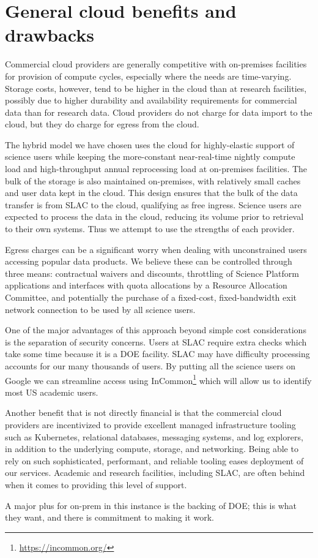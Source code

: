 \section{General cloud benefits and drawbacks} \label{sec:tradeoffs}

Commercial cloud providers are generally competitive with on-premises facilities for provision of compute cycles, especially where the needs are time-varying.
Storage costs, however, tend to be higher in the cloud than at research facilities, possibly due to higher durability and availability requirements for commercial data than for research data.
Cloud providers do not charge for data import to the cloud, but they do charge for egress from the cloud.

The hybrid model we have chosen uses the cloud for highly-elastic support of science users while keeping the more-constant near-real-time nightly compute load and high-throughput annual reprocessing load at on-premises facilities.
The bulk of the storage is also maintained on-premises, with relatively small caches and user data kept in the cloud.
This design ensures that the bulk of the data transfer is from SLAC to the cloud, qualifying as free ingress.
Science users are expected to process the data in the cloud, reducing its volume prior to retrieval to their own systems.
Thus we attempt to use the strengths of each provider.

Egress charges can be a significant worry when dealing with unconstrained users accessing popular data products.
We believe these can be controlled through three means: contractual waivers and discounts, throttling of Science Platform applications and interfaces with quota allocations by a Resource Allocation Committee, and potentially the purchase of a fixed-cost, fixed-bandwidth exit network connection to be used by all science users.

One of the major advantages of this approach beyond simple cost considerations is the separation of security concerns.
Users at SLAC require extra checks which take some time because it is a DOE facility.
SLAC may have difficulty processing accounts for our many thousands of users.
By putting all the science users on Google we can streamline access using InCommon\footnote{\url{https://incommon.org/}} which will allow us to identify most US academic users.

Another benefit that is not directly financial is that the commercial cloud providers are incentivized to provide excellent managed infrastructure tooling such as Kubernetes, relational databases, messaging systems, and log explorers, in addition to the underlying compute, storage, and networking.
Being able to rely on such sophisticated, performant, and reliable tooling eases deployment of our services.
Academic and research facilities, including SLAC, are often behind when it comes to providing this level of support.

A major plus for on-prem in this instance is the backing of DOE; this is what they want, and there is commitment to making it work.
